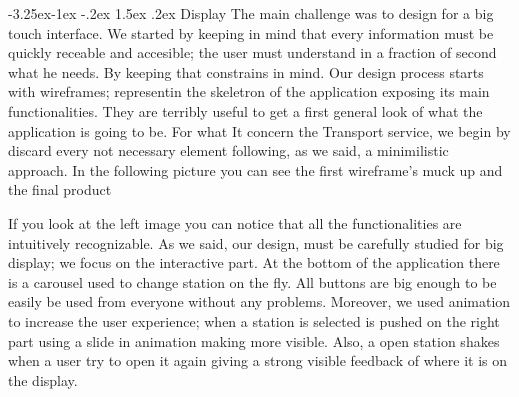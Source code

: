 \documentclass[]{usiinfbachelorproject}
\makeatletter
\newcommand\subsubsection{\@startsection{subsubsection}{3}{\z@}%
                {-3.25ex\@plus -1ex \@minus -.2ex}%
                {1.5ex \@plus .2ex}%
                {\normalfont\normalsize\bfseries}}
\makeatother
\begin{document}
\subsubsection{Display}
The main challenge was to design for a big touch interface. We started by keeping in mind that every information must be quickly receable and accesible; the user must understand in a fraction of second what he needs. By keeping that constrains in mind.
Our design process starts with wireframes; representin the skeletron of the application exposing its main functionalities. They are terribly useful to get a first general look of what the application is going to be. For what It concern the Transport service, we begin by discard every not necessary element following, as we said, a minimilistic approach. In the following picture you can see the first wireframe's muck up and the final product
\begin{figure}[H]
  \centering
  \hfill
\end{figure} 
If you look at the left image you can notice that all the functionalities are intuitively recognizable. As we said, our design, must be carefully studied for big display; we focus on the interactive part.
At the bottom of the application there is a carousel used to change station on the fly. All buttons are big enough to be easily be used from everyone without any problems.
Moreover, we used animation to increase the user experience; when a station is selected is pushed on the right part using a slide in animation making more visible. Also, a open station shakes when a user try to open it again giving a strong visible feedback of where it is on the display. 
\end{document}
